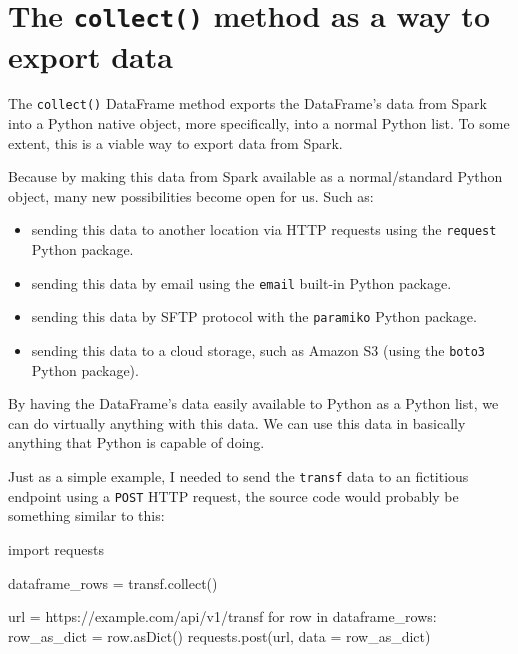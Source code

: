 \documentclass[
  11pt,
  letterpaper,
  DIV=11,
  numbers=noendperiod]{scrreprt}
\newenvironment{Shaded}{\begin{snugshade}}{\end{snugshade}}
\newcommand{\ControlFlowTok}[1]{\textcolor[rgb]{0.00,0.23,0.31}{#1}}
\newcommand{\ImportTok}[1]{\textcolor[rgb]{0.00,0.46,0.62}{#1}}
\newcommand{\KeywordTok}[1]{\textcolor[rgb]{0.00,0.23,0.31}{#1}}
\newcommand{\NormalTok}[1]{\textcolor[rgb]{0.00,0.23,0.31}{#1}}
\newcommand{\OperatorTok}[1]{\textcolor[rgb]{0.37,0.37,0.37}{#1}}
\newcommand{\StringTok}[1]{\textcolor[rgb]{0.13,0.47,0.30}{#1}}
\providecommand{\tightlist}{%
  \setlength{\itemsep}{0pt}\setlength{\parskip}{0pt}}\usepackage{longtable,booktabs,array}
\begin{document}
\hypertarget{the-collect-method-as-a-way-to-export-data}{%
\section{\texorpdfstring{The \texttt{collect()} method as a way to
export
data}{The collect() method as a way to export data}}\label{the-collect-method-as-a-way-to-export-data}}

The \texttt{collect()} DataFrame method exports the DataFrame's data
from Spark into a Python native object, more specifically, into a normal
Python list. To some extent, this is a viable way to export data from
Spark.

Because by making this data from Spark available as a normal/standard
Python object, many new possibilities become open for us. Such as:

\begin{itemize}
\tightlist
\item
  sending this data to another location via HTTP requests using the
  \texttt{request} Python package.
\item
  sending this data by email using the \texttt{email} built-in Python
  package.
\item
  sending this data by SFTP protocol with the \texttt{paramiko} Python
  package.
\item
  sending this data to a cloud storage, such as Amazon S3 (using the
  \texttt{boto3} Python package).
\end{itemize}

By having the DataFrame's data easily available to Python as a Python
list, we can do virtually anything with this data. We can use this data
in basically anything that Python is capable of doing.

Just as a simple example, I needed to send the \texttt{transf} data to
an fictitious endpoint using a \texttt{POST} HTTP request, the source
code would probably be something similar to this:

\begin{Shaded}
\begin{Highlighting}[]
\ImportTok{import}\NormalTok{ requests}

\NormalTok{dataframe\_rows }\OperatorTok{=}\NormalTok{ transf.collect()}

\NormalTok{url }\OperatorTok{=} \StringTok{\textquotesingle{}https://example.com/api/v1/transf\textquotesingle{}}
\ControlFlowTok{for}\NormalTok{ row }\KeywordTok{in}\NormalTok{ dataframe\_rows:}
\NormalTok{    row\_as\_dict }\OperatorTok{=}\NormalTok{ row.asDict()}
\NormalTok{    requests.post(url, data }\OperatorTok{=}\NormalTok{ row\_as\_dict)}
\end{Highlighting}
\end{Shaded}
\end{document}
